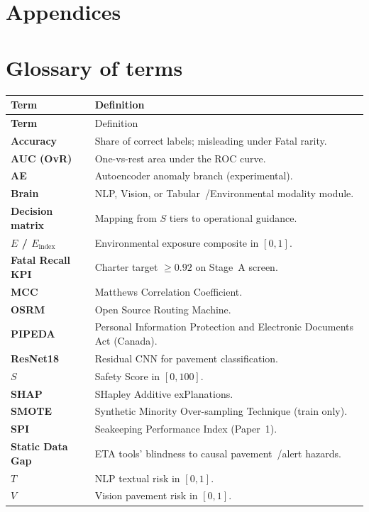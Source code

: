 \documentclass[11pt,a4paper]{article}
\begin{document}



\clearpage
\section*{Appendices}

\newpage
\section*{Glossary of terms}
\begin{longtable}{@{}>{\bfseries}p{3.2cm}p{11.5cm}@{}}
\toprule Term & Definition \\\midrule\endfirsthead
\toprule Term & Definition \\\midrule\endhead
Accuracy & Share of correct labels; misleading under Fatal rarity. \\
AUC (OvR) & One-vs-rest area under the ROC curve. \\
AE & Autoencoder anomaly branch (experimental). \\
Brain & NLP, Vision, or Tabular~/Environmental modality module. \\
Decision matrix & Mapping from $S$ tiers to operational guidance. \\
$E$ / $E_{\mathrm{index}}$ & Environmental exposure composite in $[0,1]$. \\
Fatal Recall KPI & Charter target $\ge0.92$ on Stage~A screen. \\
MCC & Matthews Correlation Coefficient. \\
OSRM & Open Source Routing Machine. \\
PIPEDA & Personal Information Protection and Electronic Documents Act (Canada). \\
ResNet18 & Residual CNN for pavement classification. \\
$S$ & Safety Score in $[0,100]$. \\
SHAP & SHapley Additive exPlanations. \\
SMOTE & Synthetic Minority Over-sampling Technique (train only). \\
SPI & Seakeeping Performance Index (Paper~1). \\
Static Data Gap & ETA tools' blindness to causal pavement~/alert hazards. \\
$T$ & NLP textual risk in $[0,1]$. \\
$V$ & Vision pavement risk in $[0,1]$. \\
\bottomrule
\end{longtable}
\end{document}
